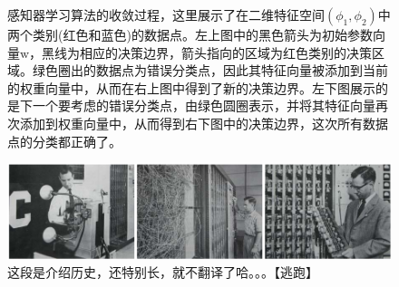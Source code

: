 \documentclass[b5paper]{book}
\numberwithin{equation}{chapter}
\newcommand {\bw} {\boldsymbol{\mathrm{w}}}
\begin{document}
{\begin{figure}[H]
\begin{minipage}[t]{0.5\linewidth}
		\label{fig:4-7d}
		\end{minipage}
		\caption{感知器学习算法的收敛过程，这里展示了在二维特征空间$(\phi_1,\phi_2)$中两个类别(红色和蓝色)的数据点。左上图中的黑色箭头为初始参数向量$\bw$，黑线为相应的决策边界，箭头指向的区域为红色类别的决策区域。绿色圈出的数据点为错误分类点，因此其特征向量被添加到当前的权重向量中，从而在右上图中得到了新的决策边界。左下图展示的是下一个要考虑的错误分类点，由绿色圆圈表示，并将其特征向量再次添加到权重向量中，从而得到右下图中的决策边界，这次所有数据点的分类都正确了。}
		\centering
		\includegraphics[scale=0.005]{Images/4-8.png}
		\caption{这段是介绍历史，还特别长，就不翻译了哈。。。【逃跑】}
		\label{fig:4-8}
	\end{figure}
	}
\end{document}
